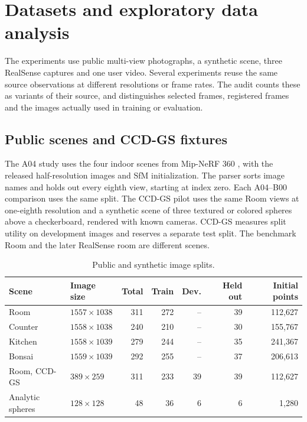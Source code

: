 \documentclass[11pt,a4paper]{article}
\begin{document}
\clearpage
\section{Datasets and exploratory data analysis}
\label{sec:datasets}
The experiments use public multi-view photographs, a synthetic scene, three
RealSense captures and one user video. Several experiments reuse the same
source observations at different resolutions or frame rates. The audit
counts these as variants of their source, and distinguishes selected frames,
registered frames and the images actually used in training or evaluation.

\subsection{Public scenes and CCD-GS fixtures}
The A04 study uses the four indoor scenes from Mip-NeRF 360
\cite{mipnerf360}, with the released half-resolution images and SfM
initialization. The parser sorts image names and holds out every eighth view,
starting at index zero. Each A04--B00 comparison uses the same split. The
CCD-GS pilot uses the same Room views at one-eighth resolution and a synthetic
scene of three textured or colored spheres above a checkerboard, rendered
with known cameras. CCD-GS measures split utility on development images and
reserves a separate test split. The benchmark Room and the later RealSense
room are different scenes.

\begin{table}[!ht]
\centering\small
\begin{tabularx}{\linewidth}{@{}Ylrrrrr@{}}
\toprule
\textbf{Scene} & \textbf{Image size} & \textbf{Total} & \textbf{Train} & \textbf{Dev.} & \textbf{Held out} & \textbf{Initial points} \\
\midrule
Room & $1557\times1038$ & 311 & 272 & -- & 39 & 112,627 \\
Counter & $1558\times1038$ & 240 & 210 & -- & 30 & 155,767 \\
Kitchen & $1558\times1039$ & 279 & 244 & -- & 35 & 241,367 \\
Bonsai & $1559\times1039$ & 292 & 255 & -- & 37 & 206,613 \\
Room, CCD-GS & $389\times259$ & 311 & 233 & 39 & 39 & 112,627 \\
Analytic spheres & $128\times128$ & 48 & 36 & 6 & 6 & 1,280 \\
\bottomrule
\end{tabularx}
\caption{Public and synthetic image splits.}
\label{tab:benchmark-data}
\end{table}
\end{document}
